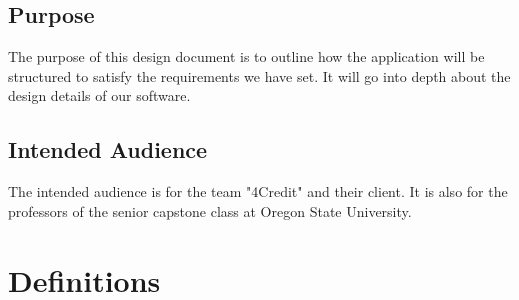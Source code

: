 \documentclass[journal,compsoc, 10pt, draftclsnofoot, onecolumn]{IEEEtran}
\begin{document}
\subsection{Purpose}
The purpose of this design document is to outline how the application will be 
structured to satisfy the requirements we have set. It will go into depth about 
the design details of our software.

\subsection{Intended Audience}
The intended audience is for the team "4Credit" and their client. It is also for
 the professors of the senior capstone class at Oregon State University.

\section{Definitions}
\end{document}
